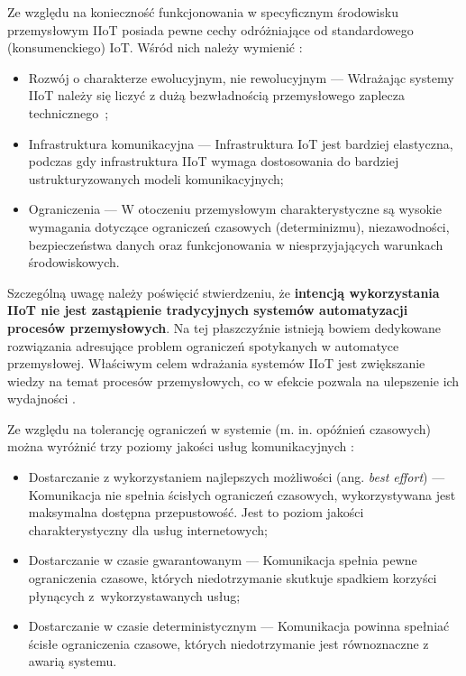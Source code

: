 \documentclass[a4paper, 12pt, twoside]{article}
\begin{document}
Ze względu na konieczność funkcjonowania w specyficznym środowisku przemysłowym
IIoT posiada pewne cechy odróżniające od standardowego (konsumenckiego) IoT.
Wśród nich należy wymienić \cite{iiot-challenges-opportunities-directions}:
\begin{itemize}
      \itemsep0em
      \item Rozwój o charakterze ewolucyjnym, nie rewolucyjnym
            --- Wdrażając systemy IIoT należy się liczyć z dużą bezwładnością
            przemysłowego zaplecza technicznego~\cite{isp};
      \item Infrastruktura komunikacyjna
            --- Infrastruktura IoT jest bardziej elastyczna, podczas gdy infrastruktura
            IIoT wymaga dostosowania do bardziej ustrukturyzowanych modeli komunikacyjnych;
      \item Ograniczenia
            --- W otoczeniu przemysłowym charakterystyczne są wysokie wymagania dotyczące
            ograniczeń czasowych (determinizmu), niezawodności, bezpieczeństwa danych oraz
            funkcjonowania w niesprzyjających warunkach środowiskowych.
\end{itemize}

Szczególną uwagę należy poświęcić stwierdzeniu, że \textbf{intencją wykorzystania IIoT nie
      jest zastąpienie tradycyjnych systemów automatyzacji procesów przemysłowych}.
Na tej płaszczyźnie istnieją bowiem dedykowane rozwiązania adresujące
problem ograniczeń spotykanych w automatyce przemysłowej.
Właściwym celem wdrażania systemów IIoT jest zwiększanie wiedzy na temat procesów
      przemysłowych, co w efekcie pozwala na ulepszenie ich wydajności \cite{iiot-challenges-opportunities-directions}.

Ze względu na tolerancję ograniczeń w systemie (m. in. opóźnień czasowych) można
wyróżnić trzy poziomy jakości usług komunikacyjnych \cite{iot-hype-to-reality}:
\begin{itemize}
      \itemsep0em
      \item Dostarczanie z wykorzystaniem najlepszych możliwości (ang. \emph{best effort})
            --- Komunikacja nie spełnia ścisłych ograniczeń czasowych, wykorzystywana jest
            maksymalna dostępna przepustowość. Jest to poziom jakości charakterystyczny
            dla usług internetowych;
      \item Dostarczanie w czasie gwarantowanym
            --- Komunikacja spełnia pewne ograniczenia czasowe, których niedotrzymanie
            skutkuje spadkiem korzyści płynących z~wykorzystawanych usług;
      \item Dostarczanie w czasie deterministycznym
            --- Komunikacja powinna spełniać ścisłe ograniczenia czasowe,
            których niedotrzymanie jest równoznaczne z awarią systemu.
\end{itemize}
\end{document}
